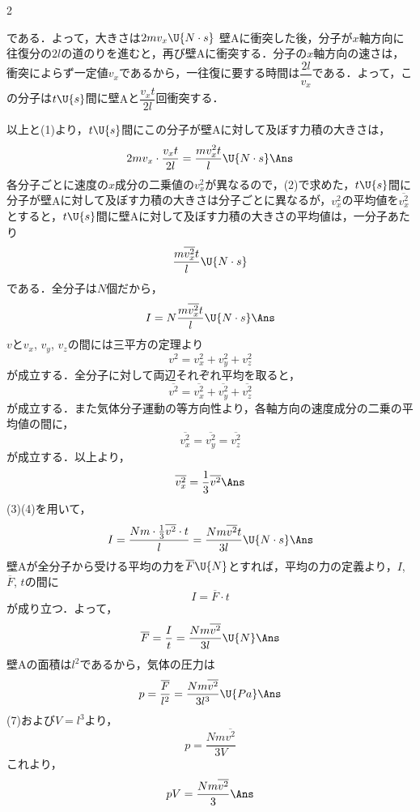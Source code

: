 \begin{multicols}{2}
\begin{komon}
       である．よって，大きさは$2mv_x\U{N\cdot s}$\Ans
{} 壁$\mathrm{A}$に衝突した後，分子が$x$軸方向に往復分の$2l$の道のりを進むと，再び壁$\mathrm{A}$に衝突する．分子の$x$軸方向の速さは，衝突によらず一定値$v_x$であるから，一往復に要する時間は$\dfrac{2l}{v_x}$である．よって，この分子は$t\U{s}$間に壁$\mathrm{A}$と$\dfrac{v_xt}{2l}$回衝突する．\par
       \hspace*{1zw}以上と(1)より，$t\U{s}$間にこの分子が壁$\mathrm{A}$に対して及ぼす力積の大きさは，
       \[2mv_x\cdot\frac{v_xt}{2l}=\frac{mv_x^2t}{l}\U{N\cdot s}\Ans\]
 各分子ごとに速度の$x$成分の二乗値の$v_x^2$が異なるので，(2)で求めた，$t\U{s}$間に分子が壁$\mathrm{A}$に対して及ぼす力積の大きさは分子ごとに異なるが，$v_x^2$の平均値を$\overline{v_x^2}$とすると，$t\U{s}$間に壁$\mathrm{A}$に対して及ぼす力積の大きさの平均値は，一分子あたり
       \[\frac{m\overline{v_x^2}t}{l}\U{N\cdot s}\]
       である．全分子は$N$個だから，
       \[I=N\frac{m\overline{v_x^2}t}{l}\U{N\cdot s}\Ans\]
 $v$と$v_x$, $v_y$, $v_z$の間には三平方の定理より
       \[v^2=v_x^2+v_y^2+v_z^2\]
       が成立する．全分子に対して両辺それぞれ平均を取ると，
       \[\overline{v^2}=\overline{v_x^2}+\overline{v_y^2}+\overline{v_z^2}\]
       が成立する．また気体分子運動の等方向性より，各軸方向の速度成分の二乗の平均値の間に，
       \[\overline{v_x^2}=\overline{v_y^2}=\overline{v_z^2}\]
       が成立する．以上より，
       \[\overline{v_x^2}=\frac{1}{3}\overline{v^2}\Ans\]
 (3)(4)を用いて，
       \[I=\frac{Nm\cdot\frac{1}{3}\overline{v^2}\cdot t}{l}=\frac{Nm\overline{v^2}t}{3l}\U{N\cdot s}\Ans\]
 壁$\mathrm{A}$が全分子から受ける平均の力を$\overline{F}\U{N}$とすれば，平均の力の定義より，$I$, $\overline{F}$, $t$の間に
       \[I=\overline{F}\cdot t\]
       が成り立つ．よって，
       \[\overline{F}=\frac{I}{t}=\frac{Nm\overline{v^2}}{3l}\U{N}\Ans\]
 壁$\mathrm{A}$の面積は$l^2$であるから，気体の圧力は
       \[p=\frac{\overline{F}}{l^2}=\frac{Nm\overline{v^2}}{3l^3}\U{Pa}\Ans\]
 (7)および$V=l^3$より，
       \[p=\frac{Nm\overline{v^2}}{3V}\]
       これより，
       \[pV=\frac{Nm\overline{v^2}}{3}\Ans\]
\end{komon}


\end{multicols}

